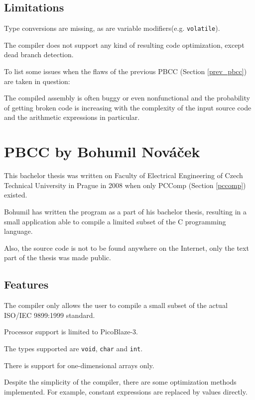         \subsection{Limitations}

        Type conversions are missing, as are variable modifiers(e.g. \texttt{volatile}). 

        The compiler does not support any kind of resulting code optimization, except dead branch detection.

        To list some issues when the flaws of the previous PBCC (Section \ref{prev_pbcc}) are taken in question:

        The compiled assembly is often buggy or even nonfunctional and the probability of getting broken code is increasing with the complexity of the input source code and the arithmetic expressions in particular.

    \section{PBCC by Bohumil Nováček}\label{not_quite_c}

    This bachelor thesis was written on Faculty of Electrical Engineering of Czech Technical University in Prague in  2008 when only PCComp (Section \ref{pccomp}) existed.

    Bohumil has written the program as a part of his bachelor thesis, resulting in a small application able to compile a limited subset of the C programming language.\cite{PbccNovacek}

    Also, the source code is not to be found anywhere on the Internet, only the text part of the thesis was made public.

        \subsection{Features}

        The compiler only allows the user to compile a small subset of the actual ISO/IEC 9899:1999 standard.

        Processor support is limited to PicoBlaze-3.

        The types supported are \texttt{void}, \texttt{char} and \texttt{int}.

        There is support for one-dimensional arrays only.

        Despite the simplicity of the compiler, there are some optimization methods implemented. For example, constant expressions are replaced by values directly.

